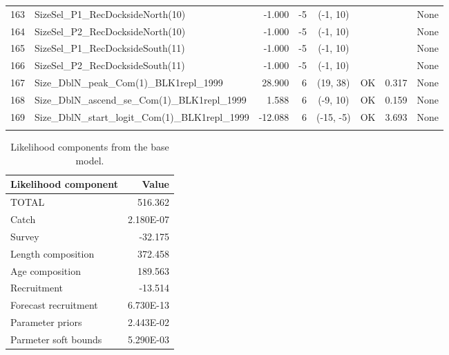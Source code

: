 \documentclass[12pt,]{article}
\begin{document}
\begin{landscape}
\begin{longtable}{rlrrcccp{1.5in}}
  163 & SizeSel\_P1\_RecDocksideNorth(10) & -1.000 & -5 & (-1, 10) &  &  & None \\ 
  164 & SizeSel\_P2\_RecDocksideNorth(10) & -1.000 & -5 & (-1, 10) &  &  & None \\ 
  165 & SizeSel\_P1\_RecDocksideSouth(11) & -1.000 & -5 & (-1, 10) &  &  & None \\ 
  166 & SizeSel\_P2\_RecDocksideSouth(11) & -1.000 & -5 & (-1, 10) &  &  & None \\ 
  167 & Size\_DblN\_peak\_Com(1)\_BLK1repl\_1999 & 28.900 & 6 & (19, 38) & OK & 0.317 & None \\ 
  168 & Size\_DblN\_ascend\_se\_Com(1)\_BLK1repl\_1999 & 1.588 & 6 & (-9, 10) & OK & 0.159 & None \\ 
  169 & Size\_DblN\_start\_logit\_Com(1)\_BLK1repl\_1999 & -12.088 & 6 & (-15, -5) & OK & 3.693 & None \\ 
   \hline
\hline
\label{tab:model_params}
\end{longtable}

\end{landscape}

\FloatBarrier

\begin{table}[ht]
\centering
\caption{Likelihood components from the base model.} 
\label{tab:like_components}
\begin{tabular}{lr}
  \hline
Likelihood component & Value \\ 
  \hline
TOTAL & 516.362 \\ 
  Catch & 2.180E-07 \\ 
  Survey & -32.175 \\ 
  Length composition & 372.458 \\ 
  Age composition & 189.563 \\ 
  Recruitment & -13.514 \\ 
  Forecast recruitment & 6.730E-13 \\ 
  Parameter priors & 2.443E-02 \\ 
  Parmeter soft bounds & 5.290E-03 \\ 
   \hline
\end{tabular}
\end{table}

\newpage
\end{document}
